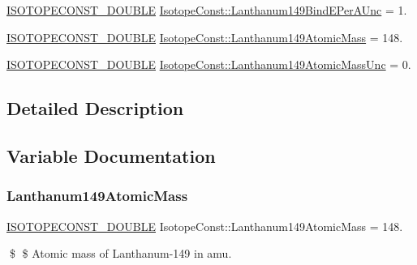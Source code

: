 \begin{DoxyCompactItemize}
\mbox{\hyperlink{group___isotope_const-_macros_ga8f45a7272ce02c0b4c65c44636ed719a}{I\+S\+O\+T\+O\+P\+E\+C\+O\+N\+S\+T\+\_\+\+D\+O\+U\+B\+LE}} \mbox{\hyperlink{group___isotope_const-_lanthanum-_la149_ga2fdc98f4af8b0438a672bef8a5de6c14}{Isotope\+Const\+::\+Lanthanum149\+Bind\+E\+Per\+A\+Unc}} = 1.
\item 
\mbox{\hyperlink{group___isotope_const-_macros_ga8f45a7272ce02c0b4c65c44636ed719a}{I\+S\+O\+T\+O\+P\+E\+C\+O\+N\+S\+T\+\_\+\+D\+O\+U\+B\+LE}} \mbox{\hyperlink{group___isotope_const-_lanthanum-_la149_gaf1226544792d830cc4d1b19519e6e1ea}{Isotope\+Const\+::\+Lanthanum149\+Atomic\+Mass}} = 148.
\item 
\mbox{\hyperlink{group___isotope_const-_macros_ga8f45a7272ce02c0b4c65c44636ed719a}{I\+S\+O\+T\+O\+P\+E\+C\+O\+N\+S\+T\+\_\+\+D\+O\+U\+B\+LE}} \mbox{\hyperlink{group___isotope_const-_lanthanum-_la149_ga318bfc90a921424dde6afec11a5be0e7}{Isotope\+Const\+::\+Lanthanum149\+Atomic\+Mass\+Unc}} = 0.
\end{DoxyCompactItemize}


\subsection{Detailed Description}


\subsection{Variable Documentation}
\mbox{\label{group___isotope_const-_lanthanum-_la149_gaf1226544792d830cc4d1b19519e6e1ea}} 
\subsubsection{\texorpdfstring{Lanthanum149\+Atomic\+Mass}{Lanthanum149AtomicMass}}
{\footnotesize\ttfamily \mbox{\hyperlink{group___isotope_const-_macros_ga8f45a7272ce02c0b4c65c44636ed719a}{I\+S\+O\+T\+O\+P\+E\+C\+O\+N\+S\+T\+\_\+\+D\+O\+U\+B\+LE}} Isotope\+Const\+::\+Lanthanum149\+Atomic\+Mass = 148.}

\$ \$ Atomic mass of Lanthanum-\/149 in amu. \mbox{\label{group___isotope_const-_lanthanum-_la149_ga318bfc90a921424dde6afec11a5be0e7}} 
